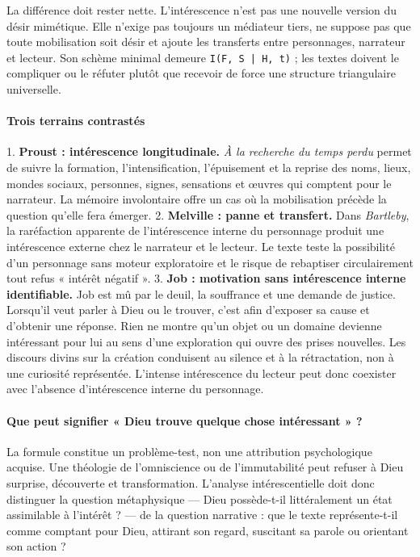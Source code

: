 \documentclass[10pt,a4paper]{article}
\begin{document}
La différence doit rester nette. L'intérescence n'est pas une nouvelle version du désir mimétique. Elle n'exige pas toujours un médiateur tiers, ne suppose pas que toute mobilisation soit désir et ajoute les transferts entre personnages, narrateur et lecteur. Son schème minimal demeure \texttt{I(F, S | H, t)} ; les textes doivent le compliquer ou le réfuter plutôt que recevoir de force une structure triangulaire universelle.

\paragraph{Trois terrains contrastés}
1. \textbf{Proust : intérescence longitudinale.} \emph{À la recherche du temps perdu} permet de    suivre la formation, l'intensification, l'épuisement et la reprise des noms, lieux,    mondes sociaux, personnes, signes, sensations et œuvres qui comptent pour le    narrateur. La mémoire involontaire offre un cas où la mobilisation précède la    question qu'elle fera émerger. 2. \textbf{Melville : panne et transfert.} Dans \emph{Bartleby}, la raréfaction apparente de    l'intérescence interne du personnage produit une intérescence externe chez le    narrateur et le lecteur. Le texte teste la possibilité d'un personnage sans moteur    exploratoire et le risque de rebaptiser circulairement tout refus « intérêt    négatif ». 3. \textbf{Job : motivation sans intérescence interne identifiable.} Job est mû par le deuil,    la souffrance et une demande de justice. Lorsqu'il veut parler à Dieu ou le trouver,    c'est afin d'exposer sa cause et d'obtenir une réponse. Rien ne montre qu'un objet ou    un domaine devienne intéressant pour lui au sens d'une exploration qui ouvre des    prises nouvelles. Les discours divins sur la création conduisent au silence et à la    rétractation, non à une curiosité représentée. L'intense intérescence du lecteur peut    donc coexister avec l'absence d'intérescence interne du personnage.

\paragraph{Que peut signifier « Dieu trouve quelque chose intéressant » ?}
La formule constitue un problème-test, non une attribution psychologique acquise. Une théologie de l'omniscience ou de l'immutabilité peut refuser à Dieu surprise, découverte et transformation. L'analyse intérescentielle doit donc distinguer la question métaphysique — Dieu possède-t-il littéralement un état assimilable à l'intérêt ? — de la question narrative : que le texte représente-t-il comme comptant pour Dieu, attirant son regard, suscitant sa parole ou orientant son action ?
\end{document}
